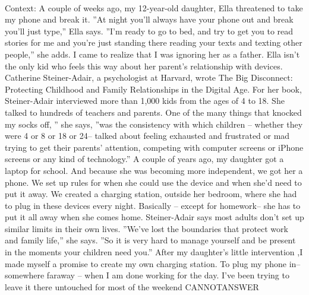 \documentclass[11pt,a4paper, onecolumn]{article}
\begin{document}
\\ Context: A couple of weeks ago, my 12-year-old daughter, Ella threatened to take my phone and break it. ''At night you'll always have your phone out and break you'll just type,'' Ella says. ''I'm ready to go to bed, and try to get you to read stories for me and you're just standing there reading your texts and texting other people,'' she adds. I came to realize that I was ignoring her as a father. Ella isn't the only kid who feels this way about her parent's relationship with devices. Catherine Steiner-Adair, a psychologist at Harvard, wrote The Big Disconnect: Protecting Childhood and Family Relationships in the Digital Age. For her book, Steiner-Adair interviewed more than 1,000 kids from the ages of 4 to 18. She talked to hundreds of teachers and parents. One of the many things that knocked my socks off, '' she says, ''was the consistency with which children -- whether they were 4 or 8 or 18 or 24-- talked about feeling exhausted and frustrated or mad trying to get their parents' attention, competing with computer screens or iPhone screens or any kind of technology.'' A couple of years ago, my daughter got a laptop for school. And because she was becoming more independent, we got her a phone. We set up rules for when she could use the device and when she'd need to put it away. We created a charging station, outside her bedroom, where she had to plug in these devices every night. Basically -- except for homework-- she has to put it all away when she comes home. Steiner-Adair says most adults don't set up similar limits in their own lives. ''We've lost the boundaries that protect work and family life,'' she says. ''So it is very hard to manage yourself and be present in the moments your children need you.'' After my daughter's little intervention ,I made myself a promise to create my own charging station. To plug my phone in-- somewhere faraway -- when I am done working for the day. I've been trying to leave it there untouched for most of the weekend CANNOTANSWER
\end{document}
